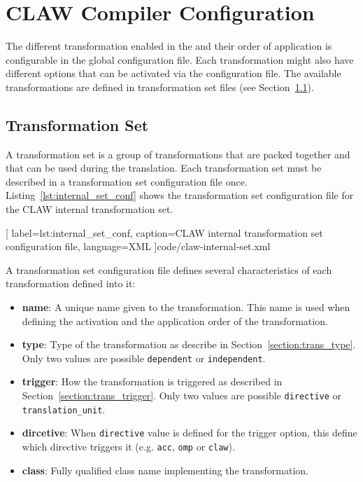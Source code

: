 \chapter{CLAW Compiler Configuration}
\label{chapter:configuration}

The different transformation enabled in the \clawfcomp and their order of
application is configurable in the \clawfcomp global configuration file. Each
transformation might also have different options that can be activated via the
configuration file. The available transformations are defined in transformation
set files (see Section~\ref{section:conf_trans_set}).

\section{Transformation Set}
\label{section:conf_trans_set}
A transformation set is a group of transformations that are packed together and
that can be used during the translation. Each transformation set must be
described in a transformation set configuration file once.
Listing~\ref{lst:internal_set_conf} shows the transformation set
configuration file for the CLAW internal transformation set.


  [
    label=lst:internal_set_conf,
    caption=CLAW internal transformation set configuration file,
    language=XML
  ]{code/claw-internal-set.xml}

A transformation set configuration file defines several characteristics of each
transformation defined into it:
\begin{itemize}
  \item \textbf{name}: A unique name given to the transformation. This name is
        used when defining the activation and the application order of the
        transformation.
  \item \textbf{type}: Type of the transformation as describe in
        Section~\ref{section:trans_type}. Only two values are possible
        \lstinline|dependent| or \lstinline|independent|.
  \item \textbf{trigger}: How the transformation is triggered as described in
        Section~\ref{section:trans_trigger}. Only two values are possible
        \lstinline|directive| or \lstinline|translation_unit|.
  \item \textbf{dircetive}: When \lstinline|directive| value is defined for the
        trigger option, this define which directive triggers it (e.g.
        \lstinline|acc|, \lstinline|omp| or \lstinline|claw|).
  \item \textbf{class}: Fully qualified class name implementing the
        transformation.
\end{itemize}

